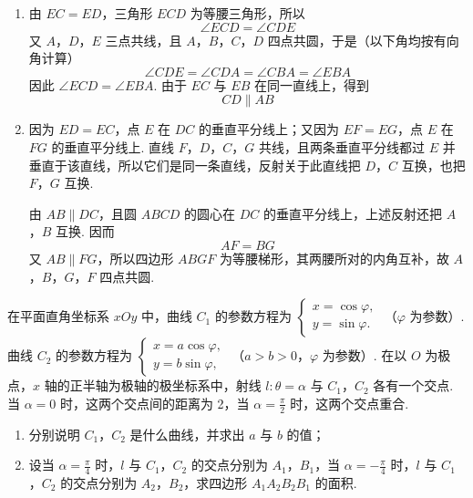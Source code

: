\begin{solution}
\begin{enumerate}
\item 由 \(EC=ED\)，三角形 \(ECD\) 为等腰三角形，所以
\[
\angle ECD=\angle CDE
\]
又 \(A\)，\(D\)，\(E\) 三点共线，且 \(A\)，\(B\)，\(C\)，\(D\) 四点共圆，于是（以下角均按有向角计算）
\[
\angle CDE=\angle CDA=\angle CBA=\angle EBA
\]
因此 \(\angle ECD=\angle EBA\). 由于 \(EC\) 与 \(EB\) 在同一直线上，得到
\[
CD\parallel AB
\]
\item 因为 \(ED=EC\)，点 \(E\) 在 \(DC\) 的垂直平分线上；又因为 \(EF=EG\)，点 \(E\) 在 \(FG\) 的垂直平分线上. 直线 \(F\)，\(D\)，\(C\)，\(G\) 共线，且两条垂直平分线都过 \(E\) 并垂直于该直线，所以它们是同一条直线，反射关于此直线把 \(D\)，\(C\) 互换，也把 \(F\)，\(G\) 互换.

由 \(AB\parallel DC\)，且圆 \(ABCD\) 的圆心在 \(DC\) 的垂直平分线上，上述反射还把 \(A\)，\(B\) 互换. 因而
\[
AF=BG
\]
又 \(AB\parallel FG\)，所以四边形 \(ABGF\) 为等腰梯形，其两腰所对的内角互补，故 \(A\)，\(B\)，\(G\)，\(F\) 四点共圆.
\end{enumerate}
\end{solution}

\begin{problem}
在平面直角坐标系 \(xOy\) 中，曲线 \(C_1\) 的参数方程为 \(\begin{cases}
x = \cos \varphi,\\
y = \sin \varphi.
\end{cases}\) （\(\varphi\) 为参数）. 曲线 \(C_2\) 的参数方程为 \(\begin{cases}
x = a\cos \varphi,\\
y = b\sin \varphi,
\end{cases}\) （\(a > b > 0\)，\(\varphi\) 为参数）. 在以 \(O\) 为极点，\(x\) 轴的正半轴为极轴的极坐标系中，射线 \(l: \theta = \alpha\) 与 \(C_1\)，\(C_2\) 各有一个交点. 当 \(\alpha = 0\) 时，这两个交点间的距离为 2，当 \(\alpha = \frac{\pi}{2}\) 时，这两个交点重合.
\begin{enumerate}
\item 分别说明 \(C_1\)，\(C_2\) 是什么曲线，并求出 \(a\) 与 \(b\) 的值；
\item 设当 \(\alpha = \frac{\pi}{4}\) 时，\(l\) 与 \(C_1\)，\(C_2\) 的交点分别为 \(A_1\)，\(B_1\)，当 \(\alpha = -\frac{\pi}{4}\) 时，\(l\) 与 \(C_1\)，\(C_2\) 的交点分别为 \(A_2\)，\(B_2\)，求四边形 \(A_1A_2B_2B_1\) 的面积.
\end{enumerate}
\end{problem}

